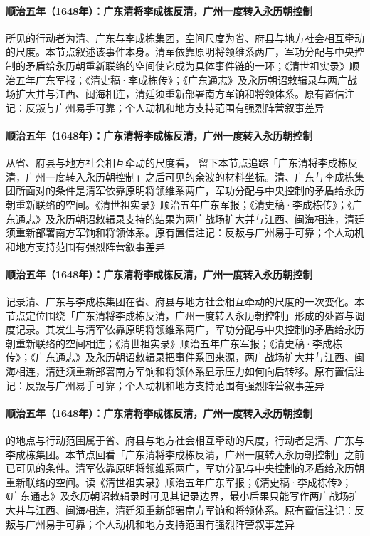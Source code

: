 \paragraph{顺治五年（1648年）：广东清将李成栋反清，广州一度转入永历朝控制}
 所见的行动者为清、广东与李成栋集团，空间尺度为省、府县与地方社会相互牵动的尺度。本节点叙述该事件本身。清军依靠原明将领维系两广，军功分配与中央控制的矛盾给永历朝重新联络的空间使它成为具体事件链的一环；《清世祖实录》顺治五年广东军报；《清史稿·李成栋传》；《广东通志》及永历朝诏敕辑录与两广战场扩大并与江西、闽海相连，清廷须重新部署南方军饷和将领体系。原有置信注记：反叛与广州易手可靠；个人动机和地方支持范围有强烈阵营叙事差异

\paragraph{顺治五年（1648年）：广东清将李成栋反清，广州一度转入永历朝控制}
从省、府县与地方社会相互牵动的尺度看， 留下本节点追踪「广东清将李成栋反清，广州一度转入永历朝控制」之后可见的余波的材料坐标。清、广东与李成栋集团所面对的条件是清军依靠原明将领维系两广，军功分配与中央控制的矛盾给永历朝重新联络的空间。《清世祖实录》顺治五年广东军报；《清史稿·李成栋传》；《广东通志》及永历朝诏敕辑录支持的结果为两广战场扩大并与江西、闽海相连，清廷须重新部署南方军饷和将领体系。原有置信注记：反叛与广州易手可靠；个人动机和地方支持范围有强烈阵营叙事差异

\paragraph{顺治五年（1648年）：广东清将李成栋反清，广州一度转入永历朝控制}
 记录清、广东与李成栋集团在省、府县与地方社会相互牵动的尺度的一次变化。本节点定位围绕「广东清将李成栋反清，广州一度转入永历朝控制」形成的处置与调度记录。其发生与清军依靠原明将领维系两广，军功分配与中央控制的矛盾给永历朝重新联络的空间相连；《清世祖实录》顺治五年广东军报；《清史稿·李成栋传》；《广东通志》及永历朝诏敕辑录把事件系回来源，两广战场扩大并与江西、闽海相连，清廷须重新部署南方军饷和将领体系显示压力如何向后转移。原有置信注记：反叛与广州易手可靠；个人动机和地方支持范围有强烈阵营叙事差异

\paragraph{顺治五年（1648年）：广东清将李成栋反清，广州一度转入永历朝控制}
 的地点与行动范围属于省、府县与地方社会相互牵动的尺度，行动者是清、广东与李成栋集团。本节点回看「广东清将李成栋反清，广州一度转入永历朝控制」之前已可见的条件。清军依靠原明将领维系两广，军功分配与中央控制的矛盾给永历朝重新联络的空间。读《清世祖实录》顺治五年广东军报；《清史稿·李成栋传》；《广东通志》及永历朝诏敕辑录时可见其记录边界，最小后果只能写作两广战场扩大并与江西、闽海相连，清廷须重新部署南方军饷和将领体系。原有置信注记：反叛与广州易手可靠；个人动机和地方支持范围有强烈阵营叙事差异

